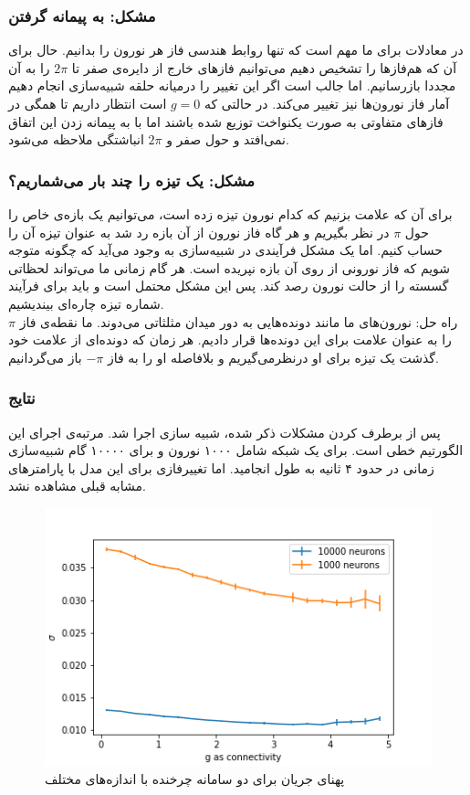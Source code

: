 \documentclass[12pt,onecolumn,a4paper]{article}
\begin{document}
\subsubsection{مشکل: به پیمانه گرفتن}
در معادلات برای ما مهم است که تنها روابط هندسی فاز هر نورون را بدانیم. حال برای آن که هم‌فازها را تشخیص دهیم می‌توانیم فاز‌های خارج از دایره‌ی صفر تا $2\pi$ را به آن مجددا بازرسانیم. اما جالب است اگر این تغییر را درمیانه حلقه شبیه‌سازی انجام دهیم آمار فاز نورون‌ها نیز تغییر می‌کند. در حالتی که $g=0$ است انتظار داریم تا همگی در فاز‌های متفاوتی به صورت یکنواخت توزیع شده باشند اما با به پیمانه زدن این اتفاق نمی‌افتد و حول صفر و $2\pi$ انباشتگی ملاحظه می‌شود.

\subsubsection{مشکل: یک تیزه را چند بار می‌شماریم؟}
برای آن که علامت بزنیم که کدام نورون تیزه زده است، می‌توانیم یک بازه‌ی خاص را حول $\pi$ در نظر بگیریم و هر گاه فاز نورون از آن بازه رد شد به عنوان تیزه آن را حساب کنیم. اما یک مشکل فرآیندی در شبیه‌سازی به وجود می‌آید که چگونه متوجه شویم که فاز نورونی از روی آن بازه نپریده است. هر گام زمانی ما می‌تواند لحظاتی گسسته را از حالت نورون رصد کند. پس این مشکل محتمل است و باید برای فرآیند شماره تیزه چاره‌ای بیندیشیم.\\

راه حل: نورون‌های ما مانند دونده‌هایی به دور میدان مثلثاتی می‌دوند. ما نقطه‌ی فاز $\pi$ را به عنوان علامت برای این دونده‌ها قرار دادیم. هر زمان که دونده‌ای از علامت خود گذشت یک تیزه برای او درنظرمی‌گیریم و بلافاصله او را به فاز $-\pi$ باز می‌گردانیم.


\subsubsection{نتایج }
پس از برطرف کردن مشکلات ذکر شده، شبیه سازی اجرا شد. مرتبه‌ی اجرای این الگورتیم خطی است. برای یک شبکه شامل ۱۰۰۰ نورون و برای ۱۰۰۰۰ گام شبیه‌سازی زمانی در حدود ۴ ثانیه به طول انجامید. اما تغییرفازی برای این مدل با پارامترهای مشابه قبلی مشاهده نشد.
\begin{figure}
\centering
  \includegraphics[width = 10 cm]{../scripts/rotational_model/two_pops_sigma.png}
 \caption{پهنای جریان برای دو سامانه چرخنده با اندازه‌های مختلف}
  \label{fig:two_pops_sync_rotational}
\end{figure}
\end{document}
